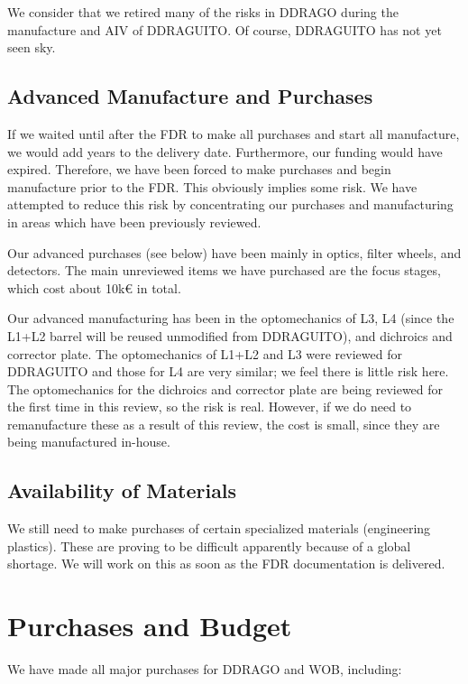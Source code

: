 \documentclass{article}
\begin{document}
We consider that we retired many of the risks in DDRAGO during the manufacture and AIV of DDRAGUITO. Of course, DDRAGUITO has not yet seen sky.

\subsection{Advanced Manufacture and Purchases}

If we waited until after the FDR to make all purchases and start all manufacture, we would add years to the delivery date. Furthermore, our funding would have expired. Therefore, we have been forced to make purchases and begin manufacture prior to the FDR. This obviously implies some risk. We have attempted to reduce this risk by concentrating our purchases and manufacturing in areas which have been previously reviewed. 

Our advanced purchases (see below) have been mainly in optics, filter wheels, and detectors. The main unreviewed items we have purchased are the focus stages, which cost about 10k€ in total.

Our advanced manufacturing has been in the optomechanics of L3, L4 (since the L1+L2 barrel will be reused unmodified from DDRAGUITO), and dichroics and corrector plate. The optomechanics of L1+L2 and L3 were reviewed for DDRAGUITO and those for L4 are very similar; we feel there is little risk here. The optomechanics for the dichroics and corrector plate are being reviewed for the first time in this review, so the risk is real. However, if we do need to  remanufacture these as a result of this review, the cost is small, since they are being manufactured in-house.

\subsection{Availability of Materials}

We still need to make purchases of certain specialized materials (engineering plastics). These are proving to be difficult apparently because of a global shortage. We will work on this as soon as the FDR documentation is delivered.

\clearpage
\section{Purchases and Budget}

We have made all major purchases for DDRAGO and WOB, including:
\end{document}
